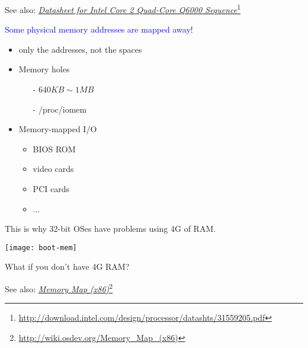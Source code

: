 See also: \href{http://download.intel.com/design/processor/datashts/31559205.pdf}{\emph{Datasheet for Intel Core 2 Quad-Core Q6000
  Sequence}}\footnote{\url{http://download.intel.com/design/processor/datashts/31559205.pdf}}

\begin{frame}%
  \begin{minipage}{.59\textwidth}
    \textcolor{blue}{Some physical memory addresses are mapped away!}
    \begin{itemize}
    \item only the addresses, not the spaces
    \item Memory holes
      \begin{itemize}
      \item[-] $640KB \sim 1MB$
      \item[-] /proc/iomem
      \end{itemize}
    \item Memory-mapped I/O
      \begin{itemize}
      \item BIOS ROM
      \item video cards
      \item PCI cards
      \item ...
      \end{itemize}
    \end{itemize}
    This is why 32-bit OSes have problems using 4G of RAM.
  \end{minipage}\hfill
  \begin{minipage}{.39\textwidth}
    \begin{center}
      \texttt{[image: boot-mem]}
    \end{center}
  \end{minipage}
  \vspace{1em}
  \begin{center}
    What if you don't have 4G RAM?
  \end{center}
\end{frame}

See also: \href{http://wiki.osdev.org/Memory_Map_(x86)}{\emph{Memory Map (x86)}}\footnote{\url{http://wiki.osdev.org/Memory_Map_(x86)}}

